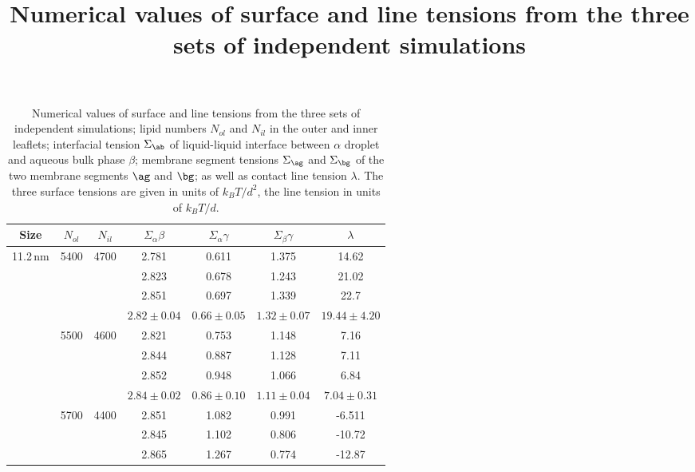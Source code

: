 \documentclass{article}
\title{Numerical  values of surface and line tensions from the three sets of independent simulations}
\begin{document}
\maketitle

\begin{table}
    \centering
    \caption{Numerical  values of surface and line tensions from the three sets of independent simulations; 
    lipid numbers $N_{ol}$ and $N_{il}$ in the outer and inner leaflets;  interfacial tension $\Sigma_\ab$ of liquid-liquid interface between $\alpha$ droplet and aqueous bulk phase $\beta$; membrane segment tensions $\Sigma_\ag$ and $\Sigma_\bg$ of 
    the two membrane segments $\ag$ and $\bg$;  as well as contact line tension 
    $\lambda$. The three surface tensions are given in units of $k_B T/d^2$, the line tension in units of $k_B T/d$.}
    \begin{tabular}{|c|c|c|c|c|c|c|}
    \hline
     Size  & $N_{ol}$ & $N_{il}$   & $\Sigma_\alpha\beta$ & $\Sigma_\alpha\gamma$ &$\Sigma_\beta\gamma$ & $\lambda$ \\
    \hline
     11.2\,nm & 5400 & 4700        & 2.781        & 0.611        & 1.375       & 14.62 \\
              &      &             & 2.823        & 0.678        & 1.243       & 21.02 \\
              &      &             & 2.851        & 0.697        & 1.339       & 22.7  \\
     \hline  
              &      &             & $2.82 \pm 0.04$ & $0.66 \pm 0.05$ & $1.32 \pm 0.07$ & $19.44 \pm 4.20$ \\
     \hline
              & 5500 & 4600        & 2.821        & 0.753        & 1.148       & 7.16 \\
              &      &             & 2.844        & 0.887        & 1.128       & 7.11 \\
              &      &             & 2.852        & 0.948        & 1.066       & 6.84 \\
     \hline
              &      &             & $2.84 \pm 0.02$ & $0.86 \pm 0.10$ & $1.11 \pm 0.04$ & $7.04  \pm 0.31$ \\
     \hline
              & 5700 & 4400        & 2.851        & 1.082        & 0.991       & -6.511 \\
              &      &             & 2.845        & 1.102        & 0.806       & -10.72 \\
              &      &             & 2.865        & 1.267        & 0.774       & -12.87 \\

\end{tabular}
\end{table}
\end{document}

